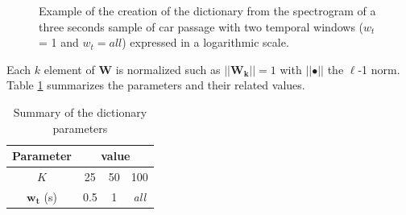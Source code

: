 \documentclass[twocolumn,a4paper,10pt]{article}
\begin{document}
\begin{figure}
    \centering
\begin{minipage}[t]{\linewidth}
    
    \caption{Example of the creation of the dictionary from the spectrogram of a three seconds sample of car passage with two temporal windows ($w_t$ = 1 and $w_t = all$) expressed in a logarithmic scale.}
    \label{fig:dictionaryExtraction}
    \end{minipage}
\end{figure}

Each $k$ element of $\mathbf{W}$ is normalized such as $\vert \vert \mathbf{W_k} \vert \vert = 1$ with $\vert \vert \bullet \vert\vert$ the $\ell$-1 norm.\\
Table \ref{tab:dictionary_factors} summarizes the parameters and their related values.

\begin{table}[h]
\centering
\begin{tabular}{cccc}
Parameter &  \multicolumn{3}{c}{value}\\ \hline
$K$ & 25  & 50 & 100 \\ \hline
$\mathbf{w_t}$ (s)& 0.5 & 1  & \textit{all}
\end{tabular}
\caption{Summary of the dictionary parameters}
\label{tab:dictionary_factors}
\end{table} 
\end{document}
